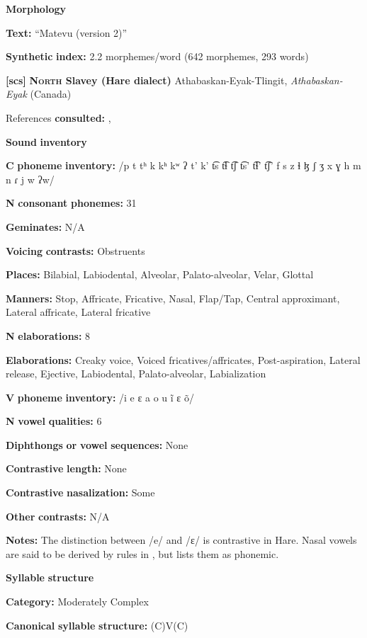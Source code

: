 \begin{styleBody}
\textbf{Morphology}

\textbf{Text:} “Matevu (version 2)” \citep[293-304]{Robinson2011}

\textbf{Synthetic} \textbf{index:} 2.2 morphemes/word (642 morphemes, 293 words)

\textbf{[scs]}   \textbf{\textsc{North} \textbf{Slavey} \textbf{(Hare} \textbf{dialect)}}  Athabaskan-Eyak-Tlingit, \textit{Athabaskan-Eyak} (Canada)

References \textbf{consulted:} \citet{Rice1989}, \citet{Rice2005}

\textbf{Sound} \textbf{inventory}

\textbf{C} \textbf{phoneme} \textbf{inventory:} /p t tʰ k kʰ kʷ ʔ t’ k’ t͡s t͡ɬ t͡ʃ t͡s’ t͡ɬ’ t͡ʃ’ f s z ɬ ɮ ʃ ʒ x ɣ h m n ɾ j w ʔw/

\textbf{N} \textbf{consonant} \textbf{phonemes:} 31

\textbf{Geminates:} N/A

\textbf{Voicing} \textbf{contrasts:} Obstruents

\textbf{Places:} Bilabial, Labiodental, Alveolar, Palato-alveolar, Velar, Glottal

\textbf{Manners:} Stop, Affricate, Fricative, Nasal, Flap/Tap, Central approximant, Lateral affricate, Lateral fricative

\textbf{N} \textbf{elaborations:} 8

\textbf{Elaborations:} Creaky voice, Voiced fricatives/affricates, Post-aspiration, Lateral release, Ejective, Labiodental, Palato-alveolar, Labialization

\textbf{V} \textbf{phoneme} \textbf{inventory:} /i e ɛ a o u ĩ ɛ õ/

\textbf{N} \textbf{vowel} \textbf{qualities:} 6

\textbf{Diphthongs} \textbf{or} \textbf{vowel} \textbf{sequences:} None

\textbf{Contrastive} \textbf{length:} None

\textbf{Contrastive} \textbf{nasalization:} Some

\textbf{Other} \textbf{contrasts:} N/A

\textbf{Notes:} The distinction between /e/ and /ɛ/ is contrastive in Hare. Nasal vowels are said to be derived by rules in \citet{Rice1989}, but \citet{Rice2005} lists them as phonemic.

\textbf{Syllable} \textbf{structure}

\textbf{Category:} Moderately Complex

\textbf{Canonical} \textbf{syllable} \textbf{structure:} (C)V(C) \citep[143-53]{Rice1989}


\end{styleBody}
